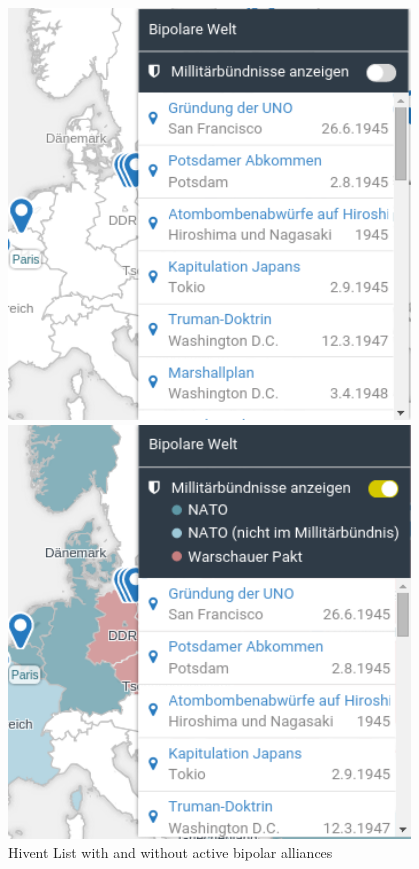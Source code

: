 \begin{figure}[H]
  \centering
  \begin{minipage}{0.45\textwidth}
    \includegraphics[width=0.95\textwidth]{graphics/bpa1.png}
  \end{minipage}
  \begin{minipage}{0.45\textwidth}
    \includegraphics[width=0.95\textwidth]{graphics/bpa2.png}
  \end{minipage}
  \caption{Hivent List with and without active bipolar alliances}
\end{figure}


